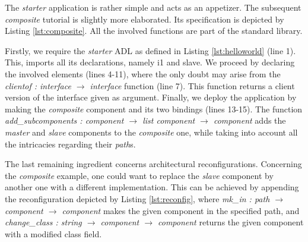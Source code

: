 	The \textit{starter} application is rather 	simple and acts as an appetizer. %
	The subsequent \textit{composite} tutorial is slightly more elaborated. Its specification
	is depicted by Listing \ref{lst:composite}. All the involved functions are part of the standard library.
	
		

	\noindent Firstly, we require the \textit{starter} ADL as defined in Listing \ref{lst:helloworld} (line 1). This, 
	imports all its declarations, namely \textsf{i1} and \textsf{slave}. We proceed by declaring the involved elements (lines 4-11),
	where the only doubt may arise from the \textit{clientof : interface $\rightarrow$ interface} 
	function (line 7). This function returns a \textsf{client} version of the \textsf{interface} given as argument. Finally,
	we deploy the application by making the \textit{composite} component and its two bindings (lines 13-15). The function \textit{add\_subcomponents : component $\rightarrow$ list component $\rightarrow$ component} 
	adds the \textit{master} and \textit{slave} components to the \textit{composite} one,	
	while taking into account all the intricacies regarding their \textit{path}s.		
				
	

	The last remaining ingredient concerns architectural reconfigurations. %
	Concerning the \textit{composite} example, one could want to replace the \textit{slave} component
	by another one with a different implementation. This can be achieved by appending the reconfiguration
	depicted by Listing \ref{lst:reconfig}, where \textit{mk\_in : path $\rightarrow$ component $\rightarrow$ component} 
	makes the given \textsf{component} in the specified path, and 
	\textit{change\_class : string $\rightarrow$  component $\rightarrow$  component} returns the given \textsf{component}
	with a modified \textsf{class} field.
	

	

